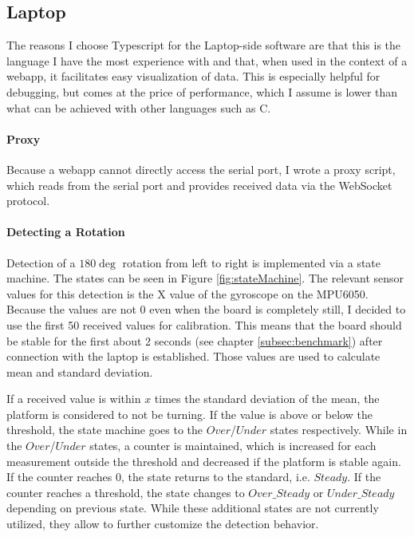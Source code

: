\subsection{Laptop}
\label{subsec:laptop}

The reasons I choose Typescript for the Laptop-side software are that this is the language I have the most experience with and that, when used in the context of a webapp, it facilitates easy visualization of data.
This is especially helpful for debugging, but comes at the price of performance, which I assume is lower than what can be achieved with other languages such as C.

\paragraph{Proxy}
Because a webapp cannot directly access the serial port, I wrote a proxy script, which reads from the serial port and provides received data via the WebSocket protocol.

\paragraph{Detecting a Rotation}
Detection of a $180\deg$ rotation from left to right is implemented via a state machine. The states can be seen in Figure \ref{fig:stateMachine}.
The relevant sensor values for this detection is the X value of the gyroscope on the MPU6050.
Because the values are not 0 even when the board is completely still, I decided to use the first 50 received values for calibration.
This means that the board should be stable for the first about 2 seconds (see chapter \ref{subsec:benchmark}) after connection with the laptop is established.
Those values are used to calculate mean and standard deviation.

If a received value is within $x$ times the standard deviation of the mean, the platform is considered to not be turning.
If the value is above or below the threshold, the state machine goes to the $Over$/$Under$ states respectively.
While in the $Over$/$Under$ states, a counter is maintained, which is increased for each measurement outside the threshold and decreased if the platform is stable again.
If the counter reaches 0, the state returns to the standard, i.e. $Steady$. If the counter reaches a threshold, the state changes to $Over\_Steady$ or $Under\_Steady$ depending on previous state.
While these additional states are not currently utilized, they allow to further customize the detection behavior.

